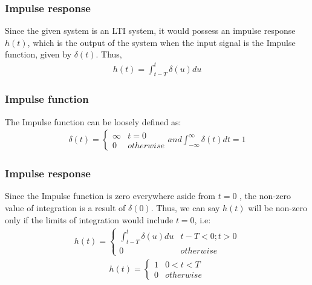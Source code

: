 \documentclass{beamer}
\begin{document}
\begin{frame}
    \frametitle{Impulse response}
    \begin{flushleft}
    Since the given system is an LTI system, it would possess an impulse response $h(t)$, which is the output of the system when the input signal is the Impulse function, given by $\delta(t)$. Thus,
\begin{align}
    h(t) = \int_{t-T}^{t} \delta(u)du
\end{align}
    \end{flushleft}
\end{frame}
\begin{frame}
    \frametitle{Impulse function}
    \begin{flushleft}
    The Impulse function can be loosely defined as:
\begin{align}
    \delta(t) = 
    \begin{cases}
\infty & t = 0\\
0 & otherwise
\end{cases}
and \int_{-\infty}^\infty \delta(t)dt  = 1
\end{align}
    \end{flushleft}
\end{frame}
\begin{frame}
    \frametitle {Impulse response}
    \begin{flushleft}
    Since the Impulse function is zero everywhere aside from $t = 0$ , the non-zero value of integration is a result of $\delta(0)$. Thus, we can say $h(t)$ will be non-zero only if the limits of integration would include $t=0$, i.e:
\begin{align}
    h(t) = 
    \begin{cases}
    \int_{t-T}^{t} \delta(u)du & t-T<0 ; t>0\\
    0 & otherwise
    \end{cases}
    \end{align}
    \begin{align}
h(t) = 
    \begin{cases}
    1 & 0<t<T\\
    0 & otherwise
    \end{cases}
\end{align}
    \end{flushleft}
\end{frame}
\end{document}
